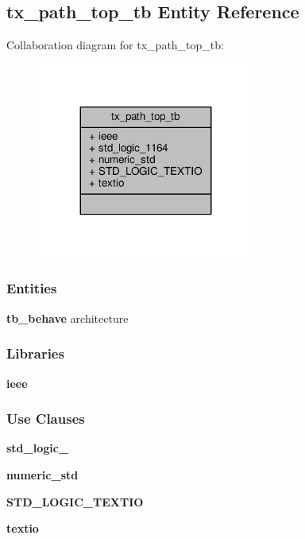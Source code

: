 \subsection{tx\+\_\+path\+\_\+top\+\_\+tb Entity Reference}
\label{classtx__path__top__tb}


Collaboration diagram for tx\+\_\+path\+\_\+top\+\_\+tb\+:\nopagebreak
\begin{figure}[H]
\begin{center}
\leavevmode
\includegraphics[width=203pt]{dd/d9a/classtx__path__top__tb__coll__graph}
\end{center}
\end{figure}
\subsubsection*{Entities}
\begin{DoxyCompactItemize}
\item 
{\bf tb\+\_\+behave} architecture
\end{DoxyCompactItemize}
\subsubsection*{Libraries}
 \begin{DoxyCompactItemize}
\item 
{\bf ieee} 
\end{DoxyCompactItemize}
\subsubsection*{Use Clauses}
 \begin{DoxyCompactItemize}
\item 
{\bf std\+\_\+logic\+\_}   
\item 
{\bf numeric\+\_\+std}   
\item 
{\bf S\+T\+D\+\_\+\+L\+O\+G\+I\+C\+\_\+\+T\+E\+X\+T\+IO}   
\item 
{\bf textio}   
\end{DoxyCompactItemize}


